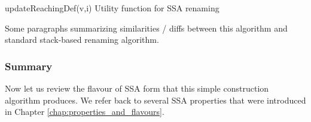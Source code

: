 \begin{procedure}
\caption{updateReachingDef(v,i) Utility
  function for SSA renaming\label{alg:classical:updateRD}}
\end{procedure}

Some paragraphs summarizing similarities / diffs between this
algorithm
and standard stack-based renaming algorithm.



\subsubsection*{Summary}

Now let us review the flavour of SSA form that this simple
construction algorithm produces. We refer back to several
SSA properties that were introduced in
Chapter \ref{chap:properties_and_flavours}.


